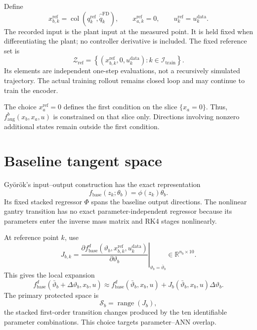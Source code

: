 \documentclass[11pt,a4paper]{article}
\newcommand{\R}{\mathbb R}
\newcommand{\col}{\operatorname{col}}
\begin{document}
Define
\begin{equation}
    x_{b,k}^{\mathrm{ref}}
    =\col(q_k^{\mathrm{ref}},\widehat{\dot q}_k^{\mathrm{FD}}),
    \qquad x_{a,k}^{\mathrm{ref}}=0,
    \qquad u_k^{\mathrm{ref}}=u_k^{\mathrm{data}}.
    \label{eq:reference-state}
\end{equation}
The recorded input is the plant input at the measured point. It is held fixed
when differentiating the plant; no controller derivative is included. The
fixed reference set is
\begin{equation}
\boxed{
    \mathcal Z_{\mathrm{ref}}
    =\left\{(x_{b,k}^{\mathrm{ref}},0,u_k^{\mathrm{data}})
      :k\in\mathcal I_{\mathrm{train}}\right\}.
}
\label{eq:reference-set}
\end{equation}
Its elements are independent one-step evaluations, not a recursively simulated
trajectory. The actual training rollout remains closed loop and may continue
to train the encoder.

The choice \(x_a^{\mathrm{ref}}=0\) defines the first condition on the slice
\(\{x_a=0\}\). Thus, \(f_{\mathrm{aug}}^b(x_b,x_a,u)\) is constrained on
that slice only. Directions involving nonzero additional states remain outside
the first condition.

\section{Baseline tangent space}

Gy\"or\"ok's input--output construction has the exact representation
\begin{equation}
    f_{\mathrm{base}}(z_k;\theta_b)=\phi(z_k)\theta_b.
\end{equation}
Its fixed stacked regressor \(\Phi\) spans the baseline output directions. The
nonlinear gantry transition has no exact parameter-independent regressor
because its parameters enter the inverse mass matrix and RK4 stages
nonlinearly.

At reference point \(k\), use
\begin{equation}
    J_{b,k}
    =\left.
      \frac{\partial f_{\mathrm{base}}^d
      (\vartheta_b,x_{b,k}^{\mathrm{ref}},u_k^{\mathrm{data}})}
      {\partial\vartheta_b}
      \right|_{\vartheta_b=\bar\vartheta_b}
    \in\R^{n_b\times10}.
    \label{eq:local-sensitivity}
\end{equation}
This gives the local expansion
\begin{equation}
 f_{\mathrm{base}}^d(\bar\vartheta_b+\Delta\vartheta_b,x_b,u)
 \approx f_{\mathrm{base}}^d(\bar\vartheta_b,x_b,u)
 +J_b(\bar\vartheta_b,x_b,u)\Delta\vartheta_b.
\end{equation}
The primary protected space is
\begin{equation}
    \mathcal S_b=\operatorname{range}(J_b),
    \label{eq:protected-space}
\end{equation}
the stacked first-order transition changes produced by the ten identifiable
parameter combinations. This choice targets parameter--ANN overlap.
\end{document}
